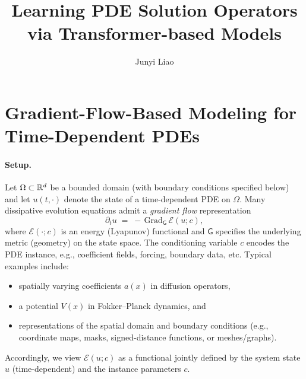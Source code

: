 \documentclass[11pt]{article}
\title{\bf Learning PDE Solution Operators via Transformer-based Models}
\author{Junyi Liao}
\date{}
\newcommand{\Grad}{\mathrm{Grad}}
\begin{document}
\maketitle
\section{Gradient-Flow-Based Modeling for Time-Dependent PDEs}
\label{sec:gradflow_pde}

\paragraph{Setup.}
Let $\Omega\subset{{\mathbb{R}}}^d$ be a bounded domain (with boundary conditions specified below) and let $u(t,\cdot)$ denote the state of a time-dependent PDE on $\Omega$.
Many dissipative evolution equations admit a \emph{gradient flow} representation
\begin{equation}
\label{eq:gf-abstract}
\partial_t u \;=\; -\,\Grad_{\mathsf G}\,\mathcal E(u;c),
\end{equation}
where $\mathcal E(\cdot;c)$ is an energy (Lyapunov) functional and $\mathsf G$ specifies the underlying metric (geometry) on the state space.
The conditioning variable $c$ encodes the PDE instance, e.g., coefficient fields, forcing, boundary data, etc. Typical examples include:
\begin{itemize}[itemsep=-2pt,topsep=2pt]
\item[(i)] spatially varying coefficients $a(x)$ in diffusion operators,
\item[(ii)] a potential $V(x)$ in Fokker--Planck dynamics, and
\item[(iii)] representations of the spatial domain and boundary conditions (e.g., coordinate maps, masks, signed-distance functions, or meshes/graphs).
\end{itemize}
Accordingly, we view $\mathcal E(u;c)$ as a functional jointly defined by the system state $u$ (time-dependent) and the instance parameters $c$.
\end{document}
